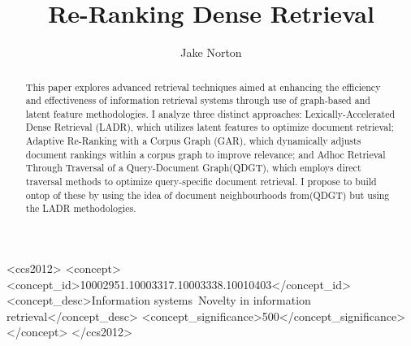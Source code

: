 \documentclass[sigconf,authorversion,nonacm]{acmart}
\begin{document}
\title{Re-Ranking Dense Retrieval}
\author{Jake Norton}



\begin{abstract}

	This paper explores advanced retrieval techniques aimed at enhancing the efficiency and
	effectiveness of information retrieval systems through use of graph-based and latent feature
	methodologies. I analyze three distinct approaches: Lexically-Accelerated Dense Retrieval
	(LADR)\cite{ladr}, which utilizes latent features to optimize document retrieval; Adaptive
	Re-Ranking with a Corpus Graph (GAR)\cite{gar}, which dynamically adjusts document rankings
	within a corpus graph to improve relevance; and Adhoc Retrieval Through Traversal of a
	Query-Document Graph(QDGT)\cite{query-document}, which employs direct traversal methods to
	optimize query-specific document retrieval. I propose to build ontop of these by using the idea
	of document neighbourhoods from(QDGT)\cite{query-document} but using the LADR methodologies.

\end{abstract}


\begin{CCSXML} <ccs2012> <concept> <concept_id>10002951.10003317.10003338.10010403</concept_id>
	<concept_desc>Information systems~Novelty in information retrieval</concept_desc>
	<concept_significance>500</concept_significance> </concept> </ccs2012>
\end{CCSXML}


\maketitle
\end{document}
